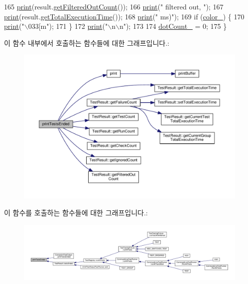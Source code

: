 \begin{DoxyCode}
165     \hyperlink{class_test_output_a321b5c489a90374cb61c34fe5d2253ef}{print}(result.\hyperlink{class_test_result_a81edc31ea12701eea6c2c083a54d71ae}{getFilteredOutCount}());
166     \hyperlink{class_test_output_a321b5c489a90374cb61c34fe5d2253ef}{print}(\textcolor{stringliteral}{" filtered out, "});
167     \hyperlink{class_test_output_a321b5c489a90374cb61c34fe5d2253ef}{print}(result.\hyperlink{class_test_result_abdeef3479981cd95bb8327312249ffe6}{getTotalExecutionTime}());
168     \hyperlink{class_test_output_a321b5c489a90374cb61c34fe5d2253ef}{print}(\textcolor{stringliteral}{" ms)"});
169     \textcolor{keywordflow}{if} (\hyperlink{class_test_output_adda8c1875964c3b80ed1c77b585fc756}{color\_}) \{
170         \hyperlink{class_test_output_a321b5c489a90374cb61c34fe5d2253ef}{print}(\textcolor{stringliteral}{"\(\backslash\)033[m"});
171     \}
172     \hyperlink{class_test_output_a321b5c489a90374cb61c34fe5d2253ef}{print}(\textcolor{stringliteral}{"\(\backslash\)n\(\backslash\)n"});
173 
174     \hyperlink{class_test_output_a3c1c7e8cf0310d384198f0dc504251c6}{dotCount\_} = 0;
175 \}
\end{DoxyCode}


이 함수 내부에서 호출하는 함수들에 대한 그래프입니다.\+:
\nopagebreak
\begin{figure}[H]
\begin{center}
\leavevmode
\includegraphics[width=350pt]{class_test_output_acc5ba82a215510b66f5f294258686dd4_cgraph}
\end{center}
\end{figure}




이 함수를 호출하는 함수들에 대한 그래프입니다.\+:
\nopagebreak
\begin{figure}[H]
\begin{center}
\leavevmode
\includegraphics[width=350pt]{class_test_output_acc5ba82a215510b66f5f294258686dd4_icgraph}
\end{center}
\end{figure}


